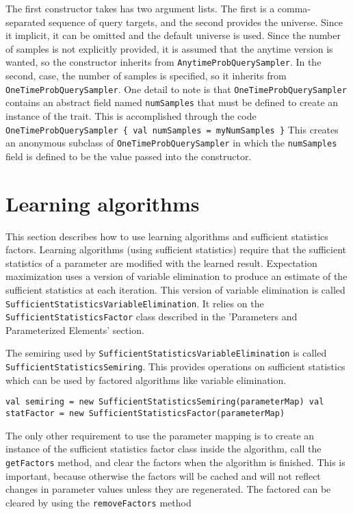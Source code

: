 The first constructor takes has two argument lists. The first is a comma-separated sequence of query targets, and the second provides the universe. Since it implicit, it can be omitted and the default universe is used. Since the number of samples is not explicitly provided, it is assumed that the anytime version is wanted, so the constructor inherits from \texttt{AnytimeProbQuerySampler}. In the second, case, the number of samples is specified, so it inherits from \texttt{OneTimeProbQuerySampler}. One detail to note is that \texttt{OneTimeProbQuerySampler} contains an abstract field named \texttt{numSamples} that must be defined to create an instance of the trait. This is accomplished through the code
\newline \texttt{OneTimeProbQuerySampler \{ val numSamples = myNumSamples \}}
This creates an anonymous subclass of \texttt{OneTimeProbQuerySampler} in which the \texttt{numSamples} field is defined to be the value passed into the constructor.

\section{Learning algorithms}

This section describes how to use learning algorithms and sufficient statistics factors. Learning algorithms (using sufficient statistics) require that the sufficient statistics of a parameter are modified with the learned result. Expectation maximization uses a version of variable elimination to produce an estimate of the sufficient statistics at each iteration. This version of variable elimination is called \texttt{SufficientStatis\-ticsVariableElimination}. It relies on the \texttt{SufficientStatisticsFactor} class described in the 'Parameters and Parameterized Elements' section.

The semiring used by \texttt{SufficientStati\-sticsVariableElimination} is called \texttt{SufficientStatisticsSemiring}. This provides operations on sufficient statistics which can be used by factored algorithms like variable elimination.

\begin{flushleft}
\texttt{val semiring = new SufficientStatisticsSemiring(parameterMap)
\newline val statFactor = new
\newline \tab SufficientStatisticsFactor(parameterMap)
}
\end{flushleft}

The only other requirement to use the parameter mapping is to create an instance of the sufficient statistics factor class inside the algorithm, call the \texttt{getFactors} method, and clear the factors when the algorithm is finished. This is important, because otherwise the factors will be cached and will not reflect changes in parameter values unless they are regenerated. The factored can be cleared by using the \texttt{removeFactors} method

